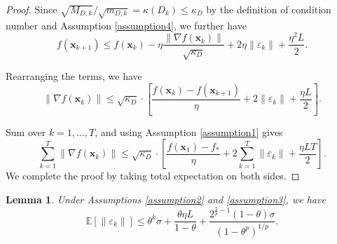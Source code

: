 \documentclass{article}
\newcommand{\bx}{\boldsymbol{x}}
\theoremstyle{plain}
\newtheorem{lemma}[theorem]{Lemma}
\theoremstyle{definition}
\theoremstyle{remark}
\begin{document}
\begin{proof}
Since $\sqrt{M_{D,k}}/\sqrt{m_{D,k}}=\kappa(D_k)\leq \kappa_D$ by the definition of condition number and Assumption \ref{assumption4}, we further have
\begin{equation*}
    f(\bx_{k+1}) \leq f(\bx_k) - \eta\frac{\|\nabla f(\bx_k)\|}{\sqrt{\kappa_D}}+2\eta\|\varepsilon_k\| + \frac{\eta^2 L}{2}.
\end{equation*}

Rearranging the terms, we have
\begin{equation*}
  \|\nabla f(\bx_k)\| \leq \sqrt{\kappa_D} \cdot \left[\frac{f(\bx_k) - f(\bx_{k+1})}{\eta} +2 \|\varepsilon_k\| + \frac{\eta L}{2}\right].  
\end{equation*}

Sum over $k=1,\dots,T$, and using Assumption \ref{assumption1} gives 
\begin{equation*}
  \sum_{k=1}^T\|\nabla f(\bx_k)\| \leq \sqrt{\kappa_D} \cdot \left[\frac{f(\bx_1) - f_{*}}{\eta} +2 \sum_{k=1}^T\|\varepsilon_k\| + \frac{\eta L T}{2}\right].  
\end{equation*}
We complete the proof by taking total expectation on both sides.
\end{proof}

\begin{lemma}\label{lemma:append2}
Under Assumptions \ref{assumption2} and \ref{assumption3}, we have
    \begin{equation*}
\mathbb{E}\left[\|\varepsilon_k\|\right] \leq \theta^k \sigma
   + \frac{\theta\eta L}{1-\theta} +  \frac{2^{\frac{2}{p}-1}(1-\theta) \sigma}{(1-\theta^p)^{1/p}}.
    \end{equation*}
\end{lemma}
\end{document}
